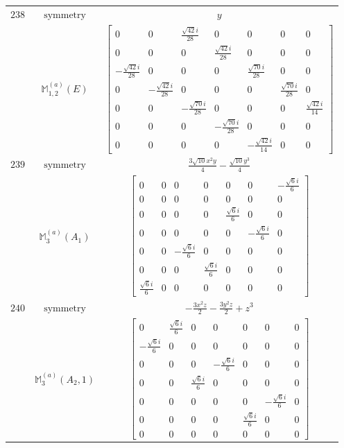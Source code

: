\documentclass[fleqn,8pt,landscape]{jsarticle}
\begin{document}
\begin{longtable}{ccc}
$ 238 $ & $ \text{symmetry} $ & $ y $ \\
$  $ & $ \mathbb{M}_{1,2}^{(a)}(E) $ & $ \begin{bmatrix} 0 & 0 & \frac{\sqrt{42} i}{28} & 0 & 0 & 0 & 0 \\ 0 & 0 & 0 & \frac{\sqrt{42} i}{28} & 0 & 0 & 0 \\ - \frac{\sqrt{42} i}{28} & 0 & 0 & 0 & \frac{\sqrt{70} i}{28} & 0 & 0 \\ 0 & - \frac{\sqrt{42} i}{28} & 0 & 0 & 0 & \frac{\sqrt{70} i}{28} & 0 \\ 0 & 0 & - \frac{\sqrt{70} i}{28} & 0 & 0 & 0 & \frac{\sqrt{42} i}{14} \\ 0 & 0 & 0 & - \frac{\sqrt{70} i}{28} & 0 & 0 & 0 \\ 0 & 0 & 0 & 0 & - \frac{\sqrt{42} i}{14} & 0 & 0 \end{bmatrix} $ \\ \hline
$ 239 $ & $ \text{symmetry} $ & $ \frac{3 \sqrt{10} x^{2} y}{4} - \frac{\sqrt{10} y^{3}}{4} $ \\
$  $ & $ \mathbb{M}_{3}^{(a)}(A_{1}) $ & $ \begin{bmatrix} 0 & 0 & 0 & 0 & 0 & 0 & - \frac{\sqrt{6} i}{6} \\ 0 & 0 & 0 & 0 & 0 & 0 & 0 \\ 0 & 0 & 0 & 0 & \frac{\sqrt{6} i}{6} & 0 & 0 \\ 0 & 0 & 0 & 0 & 0 & - \frac{\sqrt{6} i}{6} & 0 \\ 0 & 0 & - \frac{\sqrt{6} i}{6} & 0 & 0 & 0 & 0 \\ 0 & 0 & 0 & \frac{\sqrt{6} i}{6} & 0 & 0 & 0 \\ \frac{\sqrt{6} i}{6} & 0 & 0 & 0 & 0 & 0 & 0 \end{bmatrix} $ \\ \hline
$ 240 $ & $ \text{symmetry} $ & $ - \frac{3 x^{2} z}{2} - \frac{3 y^{2} z}{2} + z^{3} $ \\
$  $ & $ \mathbb{M}_{3}^{(a)}(A_{2},1) $ & $ \begin{bmatrix} 0 & \frac{\sqrt{6} i}{6} & 0 & 0 & 0 & 0 & 0 \\ - \frac{\sqrt{6} i}{6} & 0 & 0 & 0 & 0 & 0 & 0 \\ 0 & 0 & 0 & - \frac{\sqrt{6} i}{6} & 0 & 0 & 0 \\ 0 & 0 & \frac{\sqrt{6} i}{6} & 0 & 0 & 0 & 0 \\ 0 & 0 & 0 & 0 & 0 & - \frac{\sqrt{6} i}{6} & 0 \\ 0 & 0 & 0 & 0 & \frac{\sqrt{6} i}{6} & 0 & 0 \\ 0 & 0 & 0 & 0 & 0 & 0 & 0 \end{bmatrix} $ \\ \hline

\end{longtable}
\end{document}
